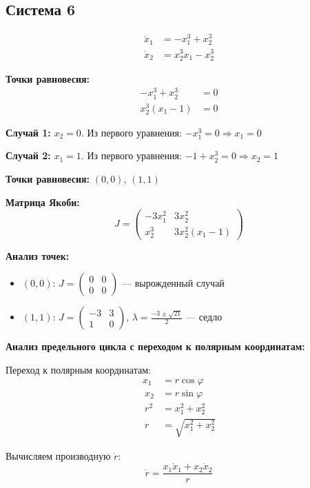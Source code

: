 \subsection*{Система 6}

\begin{align}
\dot{x}_1 &= -x_1^3 + x_2^3 \\
\dot{x}_2 &= x_2^3 x_1 - x_2^3
\end{align}

\textbf{Точки равновесия:}
\begin{align}
-x_1^3 + x_2^3 &= 0 \\
x_2^3(x_1 - 1) &= 0
\end{align}

\textbf{Случай 1:} $x_2 = 0$. Из первого уравнения: $-x_1^3 = 0 \Rightarrow x_1 = 0$

\textbf{Случай 2:} $x_1 = 1$. Из первого уравнения: $-1 + x_2^3 = 0 \Rightarrow x_2 = 1$

\textbf{Точки равновесия:} $(0, 0)$, $(1, 1)$

\textbf{Матрица Якоби:}
$$J = \begin{pmatrix} -3x_1^2 & 3x_2^2 \\ x_2^3 & 3x_2^2(x_1 - 1) \end{pmatrix}$$

\textbf{Анализ точек:}
\begin{itemize}
\item $(0, 0)$: $J = \begin{pmatrix} 0 & 0 \\ 0 & 0 \end{pmatrix}$ --- вырожденный случай
\item $(1, 1)$: $J = \begin{pmatrix} -3 & 3 \\ 1 & 0 \end{pmatrix}$, $\lambda = \frac{-3 \pm \sqrt{21}}{2}$ --- седло
\end{itemize}

\textbf{Анализ предельного цикла с переходом к полярным координатам:}

Переход к полярным координатам:
\begin{align}
x_1 &= r\cos\varphi \\\
x_2 &= r\sin\varphi \\\
r^2 &= x_1^2 + x_2^2 \\\
r &= \sqrt{x_1^2 + x_2^2}
\end{align}

Вычисляем производную $\dot{r}$:
$$\dot{r} = \frac{x_1\dot{x}_1 + x_2\dot{x}_2}{r}$$

